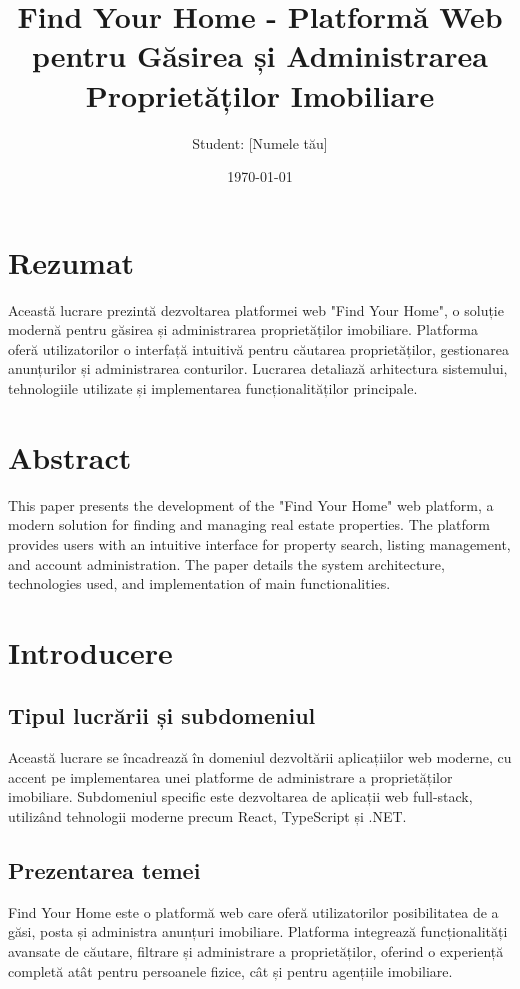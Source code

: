 \documentclass[12pt,a4paper]{report}
\title{Find Your Home - Platformă Web pentru Găsirea și Administrarea Proprietăților Imobiliare}
\author{Student: [Numele tău]}
\date{\today}
\begin{document}
\maketitle
\thispagestyle{empty}
\newpage

\chapter*{Rezumat}
Această lucrare prezintă dezvoltarea platformei web "Find Your Home", o soluție modernă pentru găsirea și administrarea proprietăților imobiliare. Platforma oferă utilizatorilor o interfață intuitivă pentru căutarea proprietăților, gestionarea anunțurilor și administrarea conturilor. Lucrarea detaliază arhitectura sistemului, tehnologiile utilizate și implementarea funcționalităților principale.

\chapter*{Abstract}
This paper presents the development of the "Find Your Home" web platform, a modern solution for finding and managing real estate properties. The platform provides users with an intuitive interface for property search, listing management, and account administration. The paper details the system architecture, technologies used, and implementation of main functionalities.

\tableofcontents
\newpage

\chapter{Introducere}
\section{Tipul lucrării și subdomeniul}
Această lucrare se încadrează în domeniul dezvoltării aplicațiilor web moderne, cu accent pe implementarea unei platforme de administrare a proprietăților imobiliare. Subdomeniul specific este dezvoltarea de aplicații web full-stack, utilizând tehnologii moderne precum React, TypeScript și .NET.

\section{Prezentarea temei}
Find Your Home este o platformă web care oferă utilizatorilor posibilitatea de a găsi, posta și administra anunțuri imobiliare. Platforma integrează funcționalități avansate de căutare, filtrare și administrare a proprietăților, oferind o experiență completă atât pentru persoanele fizice, cât și pentru agențiile imobiliare.
\end{document}
